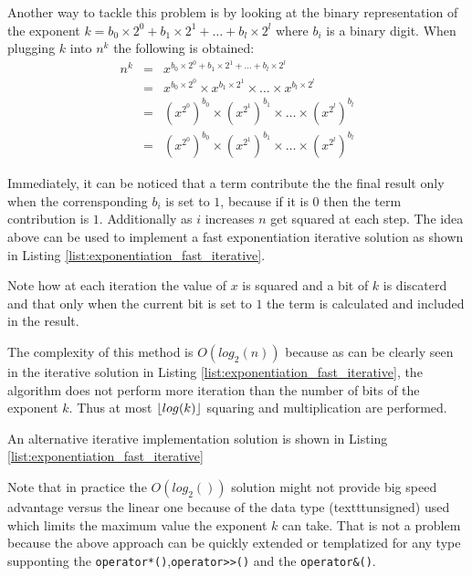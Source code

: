 Another way to tackle this problem is by looking at the binary representation of the exponent $k = b_0 \times 2^0 + b_1 \times 2^1 + \ldots + b_l \times 2^l$ where $b_i$ is a binary digit. 
When plugging $k$ into $n^k$ the following is obtained:
\[
	\begin{array}{lcl}
		n^k & = &  x^{b_0 \times 2^0 + b_1 \times 2^1 + \ldots + b_l \times 2^l} \\
		& = & x^{b_0 \times 2^0} \times x^{b_1 \times 2^1} \times \ldots \times x^{b_l \times 2^l} \\
		& = & (x^{2^0})^{b_0} \times  (x^{2^1})^{b_1} \times \ldots \times (x^{2^l})^{b_l} \\
		& = & (x^{2^0})^{b_0} \times  (x^{2^1})^{b_1} \times \ldots \times (x^{2^l})^{b_l} 
	\end{array}
\]

Immediately, it can be noticed that a term contribute the the final result only when the corrensponding $b_i$ is set to $1$, because if it is $0$ then the term contribution is $1$. Additionally as $i$ increases $n$ get squared at each step.
The idea above can be used to implement a fast exponentiation iterative solution as shown in Listing \ref{list:exponentiation_fast_iterative}.


Note how at each iteration the value of $x$ is squared and a bit of $k$ is discaterd and that only when the current bit is set to $1$ the term is calculated and included in the result. 

The complexity of this method is $O(log_2(n))$ because as can be clearly seen in the iterative solution in Listing \ref{list:exponentiation_fast_iterative}, the algorithm does not perform more iteration than the number of bits of the exponent $k$.
Thus at most $\lfloor log(k)\rfloor$ squaring and multiplication are performed.

An alternative iterative implementation solution is shown in Listing \ref{list:exponentiation_fast_iterative}


Note that in practice the $O(log_2())$  solution might not provide big speed advantage versus the linear one because of the data type (texttt{unsigned}) used which limits the maximum value the exponent $k$ can take. That is not a problem because the above approach can be quickly extended or templatized for any type supponting the \texttt{operator*()},\texttt{operator>>()} and the \texttt{operator\&()}.

